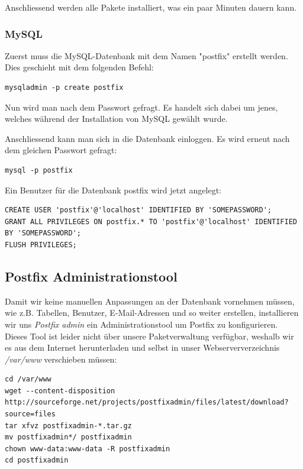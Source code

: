 
Anschliessend werden alle Pakete installiert, was ein paar Minuten dauern kann.

\subsubsection{MySQL}
Zuerst muss die MySQL-Datenbank mit dem Namen "postfix" erstellt werden. Dies geschieht mit dem folgenden Befehl:

\begin{lstlisting}
mysqladmin -p create postfix
\end{lstlisting}

Nun wird man nach dem Passwort gefragt. Es handelt sich dabei um jenes, welches während der Installation von MySQL gewählt wurde.

Anschliessend kann man sich in die Datenbank einloggen. Es wird erneut nach dem gleichen Passwort gefragt:

\begin{lstlisting}
mysql -p postfix
\end{lstlisting}

Ein Benutzer für die Datenbank postfix wird jetzt angelegt:

\begin{lstlisting}
CREATE USER 'postfix'@'localhost' IDENTIFIED BY 'SOMEPASSWORD';
GRANT ALL PRIVILEGES ON postfix.* TO 'postfix'@'localhost' IDENTIFIED BY 'SOMEPASSWORD';
FLUSH PRIVILEGES;
\end{lstlisting}

\subsection{Postfix Administrationstool}

Damit wir keine manuellen Anpassungen an der Datenbank vornehmen müssen, wie z.B. Tabellen, Benutzer, E-Mail-Adressen und so weiter erstellen, installieren wir uns \textit{Postfix admin} ein Administrationstool um Postfix zu konfigurieren. \\

Dieses Tool ist leider nicht über unsere Paketverwaltung verfügbar, weshalb wir es aus dem Internet herunterladen und selbst in unser Webserververzeichnis \textit{/var/www} verschieben müssen:

\begin{lstlisting}
cd /var/www
wget --content-disposition http://sourceforge.net/projects/postfixadmin/files/latest/download?source=files
tar xfvz postfixadmin-*.tar.gz
mv postfixadmin*/ postfixadmin
chown www-data:www-data -R postfixadmin
cd postfixadmin
\end{lstlisting}

